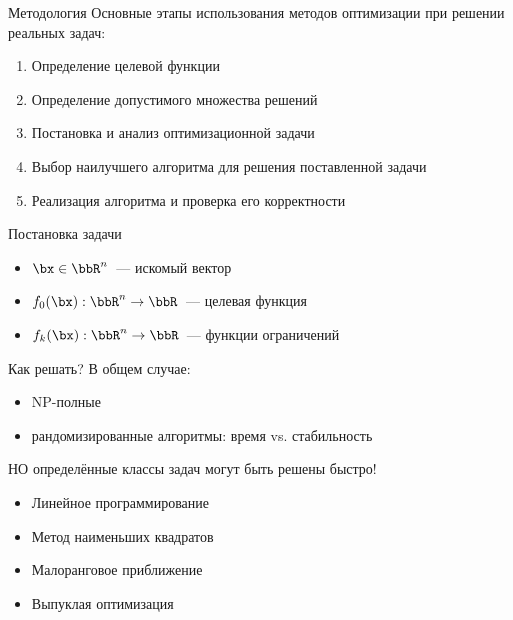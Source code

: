 \documentclass[12pt]{beamer}
\begin{document}
\begin{frame}{Методология}
Основные этапы использования методов оптимизации при решении реальных задач:
\begin{enumerate}[<+->]
\item Определение целевой функции
\item Определение допустимого множества решений
\item Постановка и анализ оптимизационной задачи
\item Выбор наилучшего алгоритма для решения поставленной задачи
\item Реализация алгоритма и проверка его корректности
\end{enumerate}

\end{frame}

\begin{frame}{Постановка задачи}
\begin{itemize}[<+->]
\item $\bx \in \bbR^n$~--- искомый вектор
\item $f_0(\bx): \bbR^n \rightarrow \bbR$~--- целевая функция
\item $f_k(\bx): \bbR^n \rightarrow \bbR$~--- функции ограничений
\end{itemize}
\end{frame}

\begin{frame}{Как решать?}
В общем случае:
\begin{itemize}
\item NP-полные
\item {\small рандомизированные алгоритмы: время vs. стабильность}
\end{itemize}

{\small НО определённые классы задач могут быть решены быстро!}

\begin{itemize}
\item Линейное программирование
\item Метод наименьших квадратов
\item Малоранговое приближение
\item Выпуклая оптимизация
\end{itemize}
\end{frame}
\end{document}
